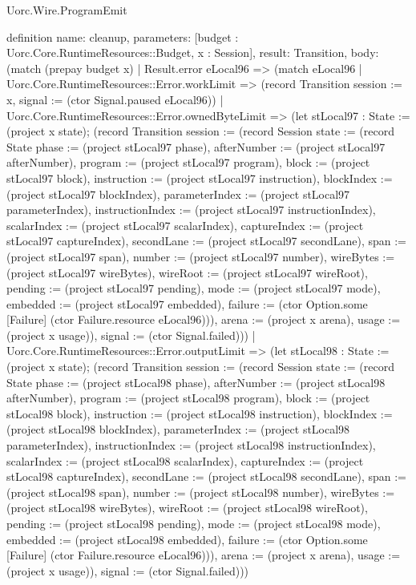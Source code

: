 \begin{lexlean}{Uorc.Wire.ProgramEmit}
\begin{semanticmodule}
definition{
  name: cleanup,
  parameters: [budget : Uorc.Core.RuntimeResources::Budget, x : Session],
  result: Transition,
  body: (match (prepay budget x)
    | Result.error eLocal96 => (match eLocal96
      | Uorc.Core.RuntimeResources::Error.workLimit => (record Transition {session := x, signal := (ctor Signal.paused eLocal96)})
      | Uorc.Core.RuntimeResources::Error.ownedByteLimit => (let stLocal97 : State := (project x state); (record Transition {session := (record Session {state := (record State {phase := (project stLocal97 phase), afterNumber := (project stLocal97 afterNumber), program := (project stLocal97 program), block := (project stLocal97 block), instruction := (project stLocal97 instruction), blockIndex := (project stLocal97 blockIndex), parameterIndex := (project stLocal97 parameterIndex), instructionIndex := (project stLocal97 instructionIndex), scalarIndex := (project stLocal97 scalarIndex), captureIndex := (project stLocal97 captureIndex), secondLane := (project stLocal97 secondLane), span := (project stLocal97 span), number := (project stLocal97 number), wireBytes := (project stLocal97 wireBytes), wireRoot := (project stLocal97 wireRoot), pending := (project stLocal97 pending), mode := (project stLocal97 mode), embedded := (project stLocal97 embedded), failure := (ctor Option.some [Failure] (ctor Failure.resource eLocal96))}), arena := (project x arena), usage := (project x usage)}), signal := (ctor Signal.failed)}))
      | Uorc.Core.RuntimeResources::Error.outputLimit => (let stLocal98 : State := (project x state); (record Transition {session := (record Session {state := (record State {phase := (project stLocal98 phase), afterNumber := (project stLocal98 afterNumber), program := (project stLocal98 program), block := (project stLocal98 block), instruction := (project stLocal98 instruction), blockIndex := (project stLocal98 blockIndex), parameterIndex := (project stLocal98 parameterIndex), instructionIndex := (project stLocal98 instructionIndex), scalarIndex := (project stLocal98 scalarIndex), captureIndex := (project stLocal98 captureIndex), secondLane := (project stLocal98 secondLane), span := (project stLocal98 span), number := (project stLocal98 number), wireBytes := (project stLocal98 wireBytes), wireRoot := (project stLocal98 wireRoot), pending := (project stLocal98 pending), mode := (project stLocal98 mode), embedded := (project stLocal98 embedded), failure := (ctor Option.some [Failure] (ctor Failure.resource eLocal96))}), arena := (project x arena), usage := (project x usage)}), signal := (ctor Signal.failed)}))
}
\end{semanticmodule}
\end{lexlean}
